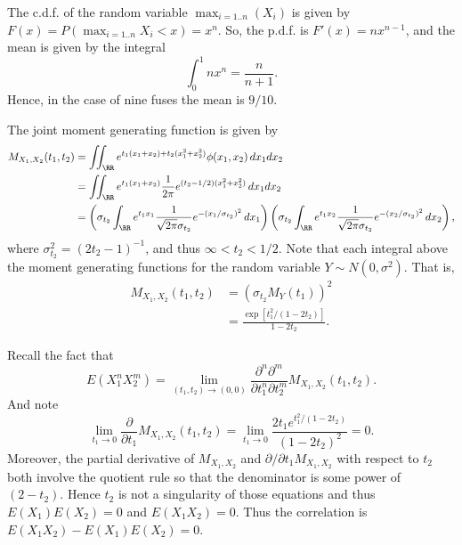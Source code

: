 \documentclass{stat_homework}
\begin{document}

\begin{solution}
  The c.d.f. of the random variable $\max_{i=1..n}(X_i)$ is given by $F(x)=P\left(\max_{i=1..n} X_i < x\right) = x^n$. So, the p.d.f. is $F'(x) = n x^{n-1}$, and the mean is given by the integral
  $$
    \int_0^1 n x^{n} = \frac{n}{n+1}.
  $$
  Hence, in the case of nine fuses the mean is $9/10$.
\end{solution}

\newpage



\begin{solution}
The joint moment generating function is given by
\begin{align*}
  M_{X_1,X_2}(t_1,t_2) 
  &= \iint_{\RR} e^{t_1(x_1 + x_2) + t_2(x_1^2 + x_2^2)} \phi(x_1,x_2) \,dx_1dx_2 \\
  &=\iint_{\RR} e^{t_1(x_1 + x_2)} \frac 1{2\pi} e^{(t_2 - 1/2)(x_1^2 + x_2^2)} \, dx_1dx_2 \\
  &=\left(\sigma_{t_2}\int_\RR e^{t_1 x_1}  \frac {1}{\sqrt{2\pi}\sigma_{t_2}} e^{-(x_1/\sigma_{t_2})^2}\,dx_1\right)
  \left(\sigma_{t_2}\int_\RR e^{t_1 x_2}  \frac {1}{\sqrt{2\pi}\sigma_{t_2}} e^{-(x_2/\sigma_{t_2})^2}\,dx_2 \right),
\end{align*}
  where $\sigma_{t_2}^2 = (2t_2 - 1)^{-1}$, and thus $\infty < t_2 < 1/2$. Note that each integral above the moment generating functions for the random variable $Y\sim N(0,\sigma^2)$.  That is,
  \begin{align*}
  M_{X_1,X_2}(t_1,t_2) 
   &=(\sigma_{t_2} M_Y(t_1))^2\\
   &= \frac{\exp\left[t_1^2/(1-2t_2)\right]}{1-2t_2}.
  \end{align*}

\end{solution}


\begin{solution}
  Recall the fact that
    $$E\left(X_1^n X_2^m\right) = \lim_{(t_1,t_2)\to(0,0)}\frac{\partial^n\partial^m}{\partial t_1^n \partial t_2^m} M_{X_1,X_2}(t_1,t_2).$$
  And note 
  $$
    \lim_{t_1\to0} \frac{\partial}{\partial t_1} M_{X_1,X_2}(t_1,t_2) = \lim_{t_1\to0} \frac{2 t_1 e^{t_1^2/(1-2t_2)}}{(1-2t_2)^2} =0.
  $$ 
  Moreover, the partial derivative of $M_{X_1,X_2}$ and $\partial/\partial t_1 M_{X_1,X_2}$ with respect to $t_2$ both involve the quotient rule so that the denominator is some power of $(2-t_2)$.  Hence $t_2$ is not a singularity of those equations and thus $E(X_1)E(X_2) = 0$ and $E(X_1 X_2) = 0$. Thus the correlation is $E(X_1 X_2) - E(X_1) E(X_2) = 0$.
\end{solution}
\end{document}
